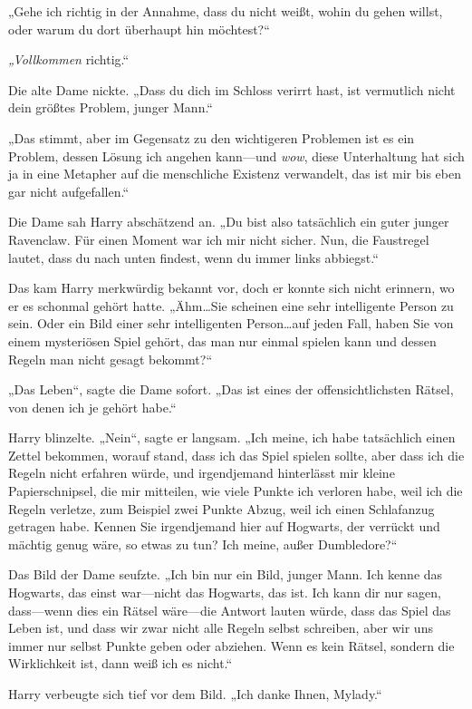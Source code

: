 {„Gehe ich richtig in der Annahme, dass du nicht weißt, wohin du gehen willst, oder warum du dort überhaupt hin möchtest?“

\emph{„Vollkommen} richtig.“

Die alte Dame nickte. „Dass du dich im Schloss verirrt hast, ist vermutlich nicht dein größtes Problem, junger Mann.“

„Das stimmt, aber im Gegensatz zu den wichtigeren Problemen ist es ein Problem, dessen Lösung ich angehen kann—und \emph{wow}, diese Unterhaltung hat sich ja in eine Metapher auf die menschliche Existenz verwandelt, das ist mir bis eben gar nicht aufgefallen.“

Die Dame sah Harry abschätzend an. „Du bist also tatsächlich ein guter junger Ravenclaw. Für einen Moment war ich mir nicht sicher. Nun, die Faustregel lautet, dass du nach unten findest, wenn du immer links abbiegst.“

Das kam Harry merkwürdig bekannt vor, doch er konnte sich nicht erinnern, wo er es schonmal gehört hatte. „Ähm…Sie scheinen eine sehr intelligente Person zu sein. Oder ein Bild einer sehr intelligenten Person…auf jeden Fall, haben Sie von einem mysteriösen Spiel gehört, das man nur einmal spielen kann und dessen Regeln man nicht gesagt bekommt?“

„Das Leben“, sagte die Dame sofort. „Das ist eines der offensichtlichsten Rätsel, von denen ich je gehört habe.“

Harry blinzelte. „Nein“, sagte er langsam. „Ich meine, ich habe tatsächlich einen Zettel bekommen, worauf stand, dass ich das Spiel spielen sollte, aber dass ich die Regeln nicht erfahren würde, und irgendjemand hinterlässt mir kleine Papierschnipsel, die mir mitteilen, wie viele Punkte ich verloren habe, weil ich die Regeln verletze, zum Beispiel zwei Punkte Abzug, weil ich einen Schlafanzug getragen habe. Kennen Sie irgendjemand hier auf Hogwarts, der verrückt und mächtig genug wäre, so etwas zu tun? Ich meine, außer Dumbledore?“

Das Bild der Dame seufzte. „Ich bin nur ein Bild, junger Mann. Ich kenne das Hogwarts, das einst war—nicht das Hogwarts, das ist. Ich kann dir nur sagen, dass—wenn dies ein Rätsel wäre—die Antwort lauten würde, dass das Spiel das Leben ist, und dass wir zwar nicht alle Regeln selbst schreiben, aber wir uns immer nur selbst Punkte geben oder abziehen. Wenn es kein Rätsel, sondern die Wirklichkeit ist, dann weiß ich es nicht.“

Harry verbeugte sich tief vor dem Bild. „Ich danke Ihnen, Mylady.“

}
